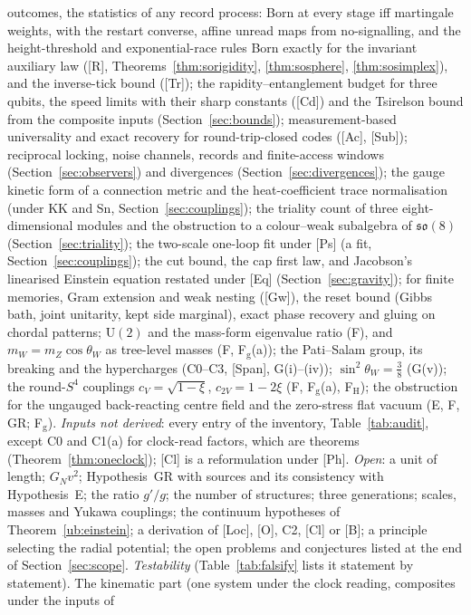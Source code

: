 \documentclass[aps,pra,onecolumn,superscriptaddress,nofootinbib,10pt]{revtex4-2}
\theoremstyle{definition}
\theoremstyle{remark}
\newcommand{\U}{\mathrm{U}}
\begin{document}
outcomes, the statistics of any record process: Born at every stage iff martingale weights, with the
restart converse, affine unread maps from no-signalling, and the height-threshold and exponential-race rules
Born exactly for the invariant auxiliary law ([R], Theorems~\ref{thm:sorigidity}, \ref{thm:sosphere}, \ref{thm:sosimplex}), and the inverse-tick
bound ([Tr]); the rapidity--entanglement budget for three qubits, the speed limits with their
sharp constants ([Cd]) and the Tsirelson bound from the composite inputs (Section~\ref{sec:bounds}); measurement-based
universality and exact recovery for round-trip-closed codes ([Ac], [Sub]); reciprocal locking, noise channels,
records and finite-access windows (Section~\ref{sec:observers}) and divergences (Section~\ref{sec:divergences}); the gauge kinetic form of a connection metric and the
heat-coefficient trace normalisation (under KK and Sn, Section~\ref{sec:couplings}); the triality count of three
eight-dimensional modules and the obstruction to a colour--weak subalgebra of $\mathfrak{so}(8)$ (Section~\ref{sec:triality}); the two-scale one-loop fit
under [Ps] (a fit, Section~\ref{sec:couplings}); the cut bound, the cap first law, and Jacobson's linearised Einstein equation
restated under [Eq] (Section~\ref{sec:gravity}); for finite memories, Gram extension and weak nesting ([Gw]), the reset bound (Gibbs bath, joint
unitarity, kept side marginal), exact phase recovery and gluing on chordal patterns; $\U(2)$ and the mass-form eigenvalue ratio (F), and $m_W=m_Z\cos\theta_W$ as tree-level masses (F, F$_{\mathrm g}$(a)); the Pati--Salam
group, its breaking and the hypercharges (C0--C3, [Span], G(i)--(iv)); $\sin^2\theta_W=\tfrac38$ (G(v));
the round-$S^4$ couplings $c_V=\sqrt{1-\xi}$, $c_{2V}=1-2\xi$ (F, F$_{\mathrm g}$(a), F$_{\mathrm H}$); the obstruction for the ungauged back-reacting centre field and the zero-stress flat vacuum (E, F, GR; F$_{\mathrm g}$).
\emph{Inputs not derived}: every entry of the inventory, Table~\ref{tab:audit}, except C0 and C1(a) for clock-read factors,
which are theorems (Theorem~\ref{thm:oneclock}); [Cl] is a reformulation under [Ph].
\emph{Open}: a unit of length; $G_Nv^2$; Hypothesis~GR with sources and its consistency with
Hypothesis~E; the ratio $g'/g$; the number of structures; three generations; scales, masses and
Yukawa couplings; the continuum hypotheses of Theorem~\ref{ub:einstein}; a derivation of [Loc], [O], C2, [Cl] or [B]; a principle
selecting the radial potential; the open problems and conjectures listed at the end of Section~\ref{sec:scope}.
\emph{Testability} (Table~\ref{tab:falsify} lists it statement by statement).  The kinematic part (one system under the clock reading, composites under the inputs of
\end{document}
